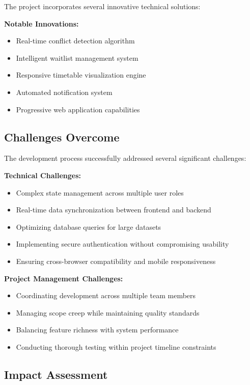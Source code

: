 The project incorporates several innovative technical solutions:

\textbf{Notable Innovations:}
\begin{itemize}[leftmargin=*]
    \item Real-time conflict detection algorithm
    \item Intelligent waitlist management system
    \item Responsive timetable visualization engine
    \item Automated notification system
    \item Progressive web application capabilities
\end{itemize}

\subsection{Challenges Overcome}

The development process successfully addressed several significant challenges:

\textbf{Technical Challenges:}
\begin{itemize}[leftmargin=*]
    \item Complex state management across multiple user roles
    \item Real-time data synchronization between frontend and backend
    \item Optimizing database queries for large datasets
    \item Implementing secure authentication without compromising usability
    \item Ensuring cross-browser compatibility and mobile responsiveness
\end{itemize}

\textbf{Project Management Challenges:}
\begin{itemize}[leftmargin=*]
    \item Coordinating development across multiple team members
    \item Managing scope creep while maintaining quality standards
    \item Balancing feature richness with system performance
    \item Conducting thorough testing within project timeline constraints
\end{itemize}

\subsection{Impact Assessment}

